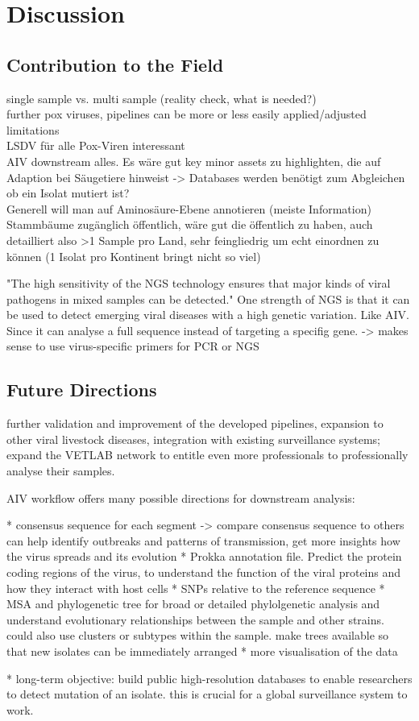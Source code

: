 \chapter{Discussion}\label{chap:discussion}

\section{Contribution to the Field}
single sample vs. multi sample (reality check, what is needed?) \\
further pox viruses, pipelines can be more or less easily applied/adjusted \\
limitations \\
LSDV für alle Pox-Viren interessant \\
AIV downstream alles. Es wäre gut key minor assets zu highlighten, die auf Adaption bei Säugetiere hinweist -> Databases werden benötigt zum Abgleichen ob ein Isolat mutiert ist? \\
Generell will man auf Aminosäure-Ebene annotieren (meiste Information) \\

Stammbäume zugänglich öffentlich, wäre gut die öffentlich zu haben, auch detailliert also >1 Sample pro Land, sehr feingliedrig um echt einordnen zu können (1 Isolat pro Kontinent bringt nicht so viel)

"The high sensitivity of the NGS technology ensures that major kinds of viral pathogens in mixed samples can be detected."
One strength of NGS is that it can be used to detect emerging viral diseases with a high genetic variation. Like AIV. Since it can analyse a full sequence instead of targeting a specifig gene. -> makes sense to use virus-specific primers for PCR or NGS 
\section{Future Directions}
further validation and improvement of the developed pipelines, expansion to other viral livestock diseases, integration with existing surveillance systems; expand the VETLAB network to entitle even more professionals to professionally analyse their samples.

AIV workflow offers many possible directions for downstream analysis:

* consensus sequence for each segment -> compare consensus sequence to others can help identify outbreaks and patterns of transmission, get more insights how the virus spreads and its evolution
* Prokka annotation file. Predict the protein coding regions of the virus, to understand the function of the viral proteins and how they interact with host cells
* SNPs relative to the reference sequence
* MSA and phylogenetic tree for broad or detailed phylolgenetic analysis and understand evolutionary relationships between the sample and other strains. could also use clusters or subtypes within the sample. make trees available so that new isolates can be immediately arranged
* more visualisation of the data

* long-term objective: build public high-resolution databases to enable researchers to detect mutation of an isolate. this is crucial for a global surveillance system to work.
